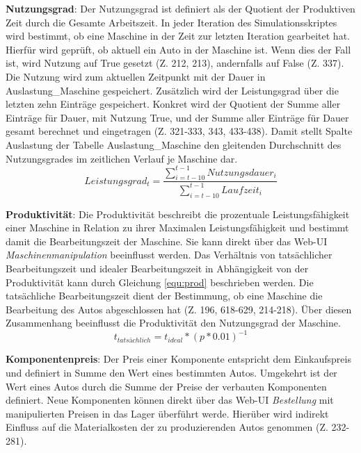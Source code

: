 \textbf{Nutzungsgrad}: Der Nutzungsgrad ist definiert als der Quotient der Produktiven Zeit durch die Gesamte Arbeitszeit. In jeder Iteration des Simulationsskriptes wird bestimmt, ob eine Maschine in der Zeit zur letzten Iteration gearbeitet hat. Hierfür wird geprüft, ob aktuell ein Auto in der Maschine ist. Wenn dies der Fall ist, wird Nutzung auf True gesetzt (Z. 212, 213), andernfalls
 auf False (Z. 337). Die Nutzung wird zum aktuellen Zeitpunkt mit der Dauer in Auslastung\_Maschine gespeichert. Zusätzlich wird der Leistungsgrad über die letzten zehn Einträge gespeichert. Konkret wird der Quotient der Summe aller Einträge für Dauer, mit Nutzung True, und der Summe aller Einträge für Dauer gesamt berechnet und eingetragen (Z. 321-333, 343, 433-438). Damit stellt Spalte Auslastung der Tabelle Auslastung\_Maschine den gleitenden Durchschnitt des Nutzungsgrades im zeitlichen Verlauf je Maschine dar.
 \begin{equation}\label{equ:nutz}
    Leistungsgrad_t = \frac{\sum_{i=t-10}^{t-1} Nutzungsdauer_i}{\sum_{i=t-10}^{t-1} Laufzeit_i}
\end{equation}

\textbf{Produktivität}: Die Produktivität beschreibt die prozentuale Leistungsfähigkeit einer Maschine in Relation zu ihrer Maximalen Leistungsfähigkeit und bestimmt damit die Bearbeitungszeit der Maschine. Sie kann direkt über das Web-UI \textit{Maschinenmanipulation} beeinflusst werden. Das Verhältnis von tatsächlicher Bearbeitungszeit und idealer Bearbeitungszeit in Abhängigkeit von der Produktivität kann durch Gleichung \ref{equ:prod} beschrieben werden. Die tatsächliche Bearbeitungszeit dient der Bestimmung, ob eine Maschine die Bearbeitung des Autos abgeschlossen hat (Z. 196, 618-629, 214-218). Über diesen Zusammenhang beeinflusst die Produktivität den Nutzungsgrad der Maschine.
\begin{equation}\label{equ:prod}
    t_{tatsächlich} = t_{ideal}*(p*0.01)^{-1}
\end{equation}

\textbf{Komponentenpreis}: Der Preis einer Komponente entspricht dem Einkaufspreis und definiert in Summe den Wert eines bestimmten Autos. Umgekehrt ist der Wert eines Autos durch die Summe der Preise der verbauten Komponenten definiert. Neue Komponenten können direkt über das Web-UI \textit{Bestellung} mit manipulierten Preisen in das Lager überführt werde. Hierüber wird indirekt Einfluss auf die Materialkosten der zu produzierenden Autos genommen (Z. 232-281).

